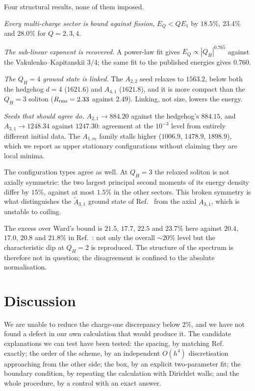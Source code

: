 \documentclass[aps,prd,preprint,nofootinbib,longbibliography]{revtex4-2}
\newcommand{\Qh}{Q_H}
\begin{document}
Four structural results, none of them imposed.

\emph{Every multi-charge sector is bound against fission}, $E_Q<QE_1$ by
$18.5\%$, $23.4\%$ and $28.0\%$ for $Q=2,3,4$.

\emph{The sub-linear exponent is recovered.} A power-law fit gives
$E_Q\propto|\Qh|^{0.765}$ against the Vakulenko--Kapitanskii $3/4$; the same fit
to the published energies gives $0.760$.

\emph{The $\Qh=4$ ground state is linked.} The $A_{2,2}$ seed relaxes to
$1563.2$, below both the hedgehog $d{=}4$ ($1621.6$) and $A_{4,1}$ ($1621.8$),
and it is more compact than the $\Qh=3$ soliton ($R_{\rm rms}=2.33$ against
$2.49$). Linking, not size, lowers the energy.

\emph{Seeds that should agree do.} $A_{2,1}\to884.20$ against the hedgehog's
$884.15$, and $A_{3,1}\to1248.34$ against $1247.30$: agreement at the $10^{-3}$
level from entirely different initial data. The $A_{1,m}$ family stalls higher
($1006.9$, $1478.9$, $1898.9$), which we report as upper stationary
configurations without claiming they are local minima.

The configuration types agree as well. At $\Qh=3$ the relaxed soliton is not
axially symmetric: the two largest principal second moments of its energy
density differ by $15\%$, against at most $1.5\%$ in the other sectors. This
broken symmetry is what distinguishes the $\widetilde{A}_{3,1}$ ground state of
Ref.~\cite{sutcliffe2007} from the axial $A_{3,1}$, which is unstable to coiling.

The excess over Ward's bound is $21.5$, $17.7$, $22.5$ and $23.7\%$ here against
$20.4$, $17.0$, $20.8$ and $21.8\%$ in Ref.~\cite{sutcliffe2007}: not only the
overall $\sim20\%$ level but the characteristic dip at $\Qh=2$ is reproduced. The
structure of the spectrum is therefore not in question; the disagreement is
confined to the absolute normalisation.

\section{Discussion}

We are unable to reduce the charge-one discrepancy below $2\%$, and we have not
found a defect in our own calculation that would produce it. The candidate
explanations we can test have been tested: the spacing, by matching
Ref.~\cite{sutcliffe2007} exactly; the order of the scheme, by an independent
$O(h^4)$ discretisation approaching from the other side; the box, by an explicit
two-parameter fit; the boundary condition, by repeating the calculation with
Dirichlet walls; and the whole procedure, by a control with an exact answer.
\end{document}

